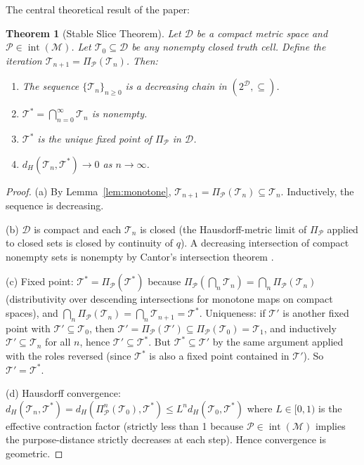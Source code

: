 \documentclass[10pt,twocolumn]{article}
\newtheorem{theorem}{Theorem}[section]
\DeclareMathOperator{\interior}{int}
\newcommand{\ProbeOp}{\Pi_\mathcal{P}}
\newcommand{\TruthCell}{\mathcal{T}}
\newcommand{\PurposePoint}{\mathcal{P}}
\newcommand{\DataSpace}{\mathcal{D}}
\newcommand{\ManifoldM}{\mathcal{M}}
\begin{document}
The central theoretical result of the paper:

\begin{theorem}[Stable Slice Theorem]
\label{thm:fixed-point}
Let $\DataSpace$ be a compact metric space and $\PurposePoint \in \interior(\ManifoldM)$.
Let $\TruthCell_0 \subseteq \DataSpace$ be any nonempty closed truth cell.
Define the iteration $\TruthCell_{n+1} = \ProbeOp(\TruthCell_n)$.
Then:
\begin{enumerate}[label=(\alph*)]
\item The sequence $\{\TruthCell_n\}_{n \geq 0}$ is a decreasing chain in $(2^\DataSpace, \subseteq)$.
\item $\TruthCell^* = \bigcap_{n=0}^\infty \TruthCell_n$ is nonempty.
\item $\TruthCell^*$ is the unique fixed point of $\ProbeOp$ in $\DataSpace$.
\item $d_H(\TruthCell_n, \TruthCell^*) \to 0$ as $n \to \infty$.
\end{enumerate}
\end{theorem}

\begin{proof}
(a) By Lemma~\ref{lem:monotone}, $\TruthCell_{n+1} = \ProbeOp(\TruthCell_n) \subseteq \TruthCell_n$.
Inductively, the sequence is decreasing.

(b) $\DataSpace$ is compact and each $\TruthCell_n$ is closed (the Hausdorff-metric
limit of $\ProbeOp$ applied to closed sets is closed by continuity of $q$).
A decreasing intersection of compact nonempty sets is nonempty by
Cantor's intersection theorem \cite{munkres2000}.

(c) Fixed point: $\TruthCell^* = \ProbeOp(\TruthCell^*)$ because
$\ProbeOp(\bigcap_n \TruthCell_n) = \bigcap_n \ProbeOp(\TruthCell_n)$
(distributivity over descending intersections for monotone maps on compact spaces),
and $\bigcap_n \ProbeOp(\TruthCell_n) = \bigcap_n \TruthCell_{n+1} = \TruthCell^*$.
Uniqueness: if $\TruthCell'$ is another fixed point with $\TruthCell' \subseteq \TruthCell_0$,
then $\TruthCell' = \ProbeOp(\TruthCell') \subseteq \ProbeOp(\TruthCell_0) = \TruthCell_1$,
and inductively $\TruthCell' \subseteq \TruthCell_n$ for all $n$,
hence $\TruthCell' \subseteq \TruthCell^*$. But $\TruthCell^* \subseteq \TruthCell'$
by the same argument applied with the roles reversed (since $\TruthCell^*$ is
also a fixed point contained in $\TruthCell'$). So $\TruthCell' = \TruthCell^*$.

(d) Hausdorff convergence: $d_H(\TruthCell_n, \TruthCell^*)
= d_H(\ProbeOp^n(\TruthCell_0), \TruthCell^*)
\leq L^n d_H(\TruthCell_0, \TruthCell^*)$
where $L \in [0,1)$ is the effective contraction factor (strictly less than 1
because $\PurposePoint \in \interior(\ManifoldM)$ implies the purpose-distance
strictly decreases at each step). Hence convergence is geometric.
\end{proof}
\end{document}
